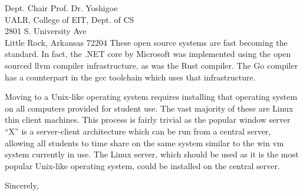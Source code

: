 \documentclass{letter}
\begin{document}
\begin{letter}{
    Dept. Chair Prof. Dr. Yoshigoe \\
    UALR, College of EIT, Dept. of CS \\
    2801 S. University Ave \\
    Little Rock, Arkansas 72204
  }
    These open source systems are fast becoming the standard. In fact, the .NET core by Microsoft was implemented using the open sourced \gls{llvm} compiler infrastructure, as was the Rust compiler. The Go compiler has a counterpart in the \gls{gcc} toolchain which uses that infrastructure.

    Moving to a Unix-like operating system requires installing that operating system on all computers provided for student use. The vast majority of these are Linux thin client machines. This process is fairly trivial as the popular window server ``X'' is a server-client architecture which can be run from a central server, allowing all students to time share on the same system similar to the \gls{win} \gls{vm} system currently in use. The Linux server, which should be used as it is the most popular Unix-like operating system, could be installed on the central server.

    \closing{Sincerely,}

  \end{letter}

  \printglossaries
  \printbibliography
\end{document}
